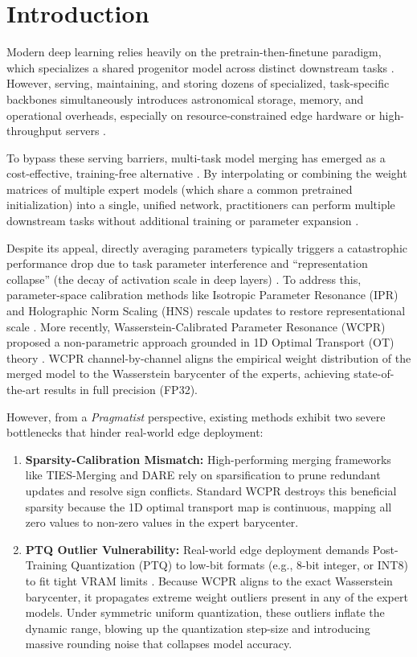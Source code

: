 \documentclass{article}
\theoremstyle{plain}
\theoremstyle{definition}
\theoremstyle{remark}
\begin{document}
\section{Introduction}
\label{sec:intro}
Modern deep learning relies heavily on the pretrain-then-finetune paradigm, which specializes a shared progenitor model across distinct downstream tasks \cite{he2016deep}. However, serving, maintaining, and storing dozens of specialized, task-specific backbones simultaneously introduces astronomical storage, memory, and operational overheads, especially on resource-constrained edge hardware or high-throughput servers \cite{brown2020language}. 

To bypass these serving barriers, multi-task model merging has emerged as a cost-effective, training-free alternative \cite{wortsman2022robust,ilharco23editing}. By interpolating or combining the weight matrices of multiple expert models (which share a common pretrained initialization) into a single, unified network, practitioners can perform multiple downstream tasks without additional training or parameter expansion \cite{yadav2023ties,tokuda2024dare}. 

Despite its appeal, directly averaging parameters typically triggers a catastrophic performance drop due to task parameter interference and ``representation collapse'' (the decay of activation scale in deep layers) \cite{jordan2023repair}. To address this, parameter-space calibration methods like Isotropic Parameter Resonance (IPR) and Holographic Norm Scaling (HNS) rescale updates to restore representational scale \cite{leclaire2024isotropic}. More recently, Wasserstein-Calibrated Parameter Resonance (WCPR) proposed a non-parametric approach grounded in 1D Optimal Transport (OT) theory \cite{theorist2026wcpr}. WCPR channel-by-channel aligns the empirical weight distribution of the merged model to the Wasserstein barycenter of the experts, achieving state-of-the-art results in full precision (FP32).

However, from a \emph{Pragmatist} perspective, existing methods exhibit two severe bottlenecks that hinder real-world edge deployment:
\begin{enumerate}
    \item \textbf{Sparsity-Calibration Mismatch:} High-performing merging frameworks like TIES-Merging \cite{yadav2023ties} and DARE \cite{tokuda2024dare} rely on sparsification to prune redundant updates and resolve sign conflicts. Standard WCPR destroys this beneficial sparsity because the 1D optimal transport map is continuous, mapping all zero values to non-zero values in the expert barycenter.
    \item \textbf{PTQ Outlier Vulnerability:} Real-world edge deployment demands Post-Training Quantization (PTQ) to low-bit formats (e.g., 8-bit integer, or INT8) to fit tight VRAM limits \cite{dettmers2022gpt3}. Because WCPR aligns to the exact Wasserstein barycenter, it propagates extreme weight outliers present in any of the expert models. Under symmetric uniform quantization, these outliers inflate the dynamic range, blowing up the quantization step-size and introducing massive rounding noise that collapses model accuracy.
\end{enumerate}
\end{document}
